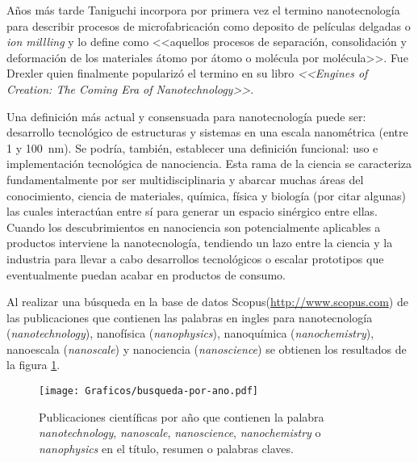 	Años más tarde Taniguchi incorpora por primera vez el termino nanotecnología para describir procesos de microfabricación como deposito de películas delgadas o \textit{ion millling} y lo define como <<aquellos procesos de separación, consolidación y deformación de los materiales átomo por átomo o molécula por molécula>>. \cite{taniguchi1974} Fue Drexler quien finalmente popularizó el termino en su libro \textit{<<Engines of Creation: The Coming Era of Nanotechnology>>}\cite{drexler1987}. 

	Una definición más actual y consensuada para nanotecnología puede ser: desarrollo tecnológico de estructuras y sistemas en una escala nanométrica (entre 1 y \SI{100}{\nm}). Se podría, también, establecer una definición funcional: uso e implementación tecnológica de nanociencia. Esta rama de la ciencia se caracteriza fundamentalmente por ser multidisciplinaria y abarcar muchas áreas del conocimiento, ciencia de materiales, química, física y biología (por citar algunas) las cuales interactúan entre sí para generar un espacio sinérgico entre ellas. Cuando los descubrimientos en nanociencia son potencialmente aplicables a productos interviene la nanotecnología, tendiendo un lazo entre la ciencia y la industria para llevar a cabo desarrollos tecnológicos o escalar prototipos que eventualmente puedan acabar en productos de consumo.
	
	Al realizar una búsqueda en la base de datos Scopus\textsuperscript\textregistered (\url{http://www.scopus.com}) de las publicaciones que contienen las palabras en ingles para nanotecnología (\textit{nanotechnology}), nanofísica (\textit{nanophysics}), nanoquímica (\textit{nanochemistry}), nanoescala (\textit{nanoscale}) y nanociencia (\textit{nanoscience}) se obtienen los resultados de la figura \ref{fig:publicaciones-ano}. 

			\vspace*{-0.7cm}
 			\begin{figure}[ht!]
 			\begin{center}
 			\texttt{[image: Graficos/busqueda-por-ano.pdf]}
 			\vspace*{-0.4cm}
 			\caption[Publicaciones por año en nanotecnología]{Publicaciones científicas por año que contienen la palabra \textit{nanotechnology}, \textit{nanoscale}, \textit{nanoscience}, \textit{nanochemistry} o \textit{nanophysics} en el título, resumen o palabras claves.}
 			\label{fig:publicaciones-ano} 		    
 			\end{center}
 		    \end{figure}
	
